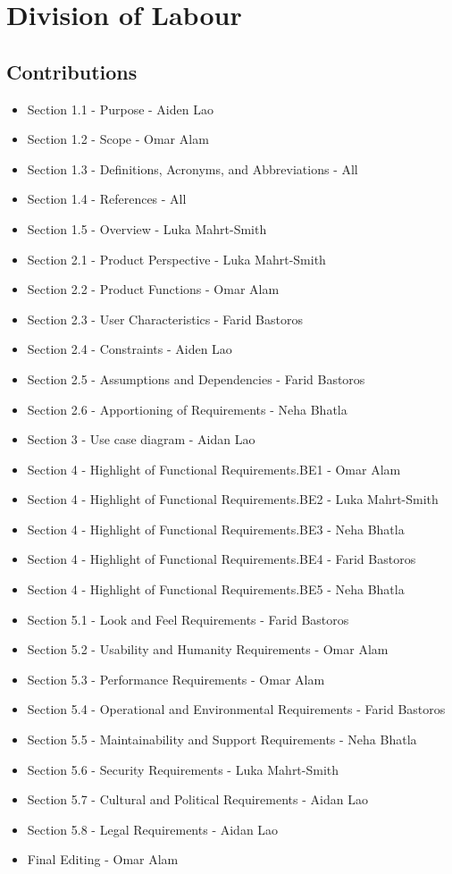 \documentclass[]{article}
\begin{document}


\appendix
\section{Division of Labour}
\label{sec:division_of_labour}

\subsection{Contributions}


\begin{itemize}
	\item Section 1.1 - Purpose - Aiden Lao
	\item Section 1.2 - Scope - Omar Alam
	\item Section 1.3 - Definitions, Acronyms, and Abbreviations - All
	\item Section 1.4 - References - All
	\item Section 1.5 - Overview - Luka Mahrt-Smith
	\item Section 2.1 - Product Perspective - Luka Mahrt-Smith
	\item Section 2.2 - Product Functions - Omar Alam
	\item Section 2.3 - User Characteristics - Farid Bastoros
	\item Section 2.4 - Constraints - Aiden Lao
	\item Section 2.5 - Assumptions and Dependencies - Farid Bastoros
	\item Section 2.6 - Apportioning of Requirements - Neha Bhatla
	\item Section 3 - Use case diagram - Aidan Lao
	\item Section 4 - Highlight of Functional Requirements.BE1 - Omar Alam
	\item Section 4 - Highlight of Functional Requirements.BE2 - Luka Mahrt-Smith
	\item Section 4 - Highlight of Functional Requirements.BE3 - Neha Bhatla
	\item Section 4 - Highlight of Functional Requirements.BE4 - Farid Bastoros
	\item Section 4 - Highlight of Functional Requirements.BE5 - Neha Bhatla
	\item Section 5.1 - Look and Feel Requirements - Farid Bastoros
	\item Section 5.2 - Usability and Humanity Requirements - Omar Alam
	\item Section 5.3 - Performance Requirements - Omar Alam
	\item Section 5.4 - Operational and Environmental Requirements - Farid Bastoros
	\item Section 5.5 - Maintainability and Support Requirements - Neha Bhatla
	\item Section 5.6 - Security Requirements - Luka Mahrt-Smith
	\item Section 5.7 - Cultural and Political Requirements - Aidan Lao
	\item Section 5.8 - Legal Requirements - Aidan Lao
	\item Final Editing - Omar Alam
\end{itemize}
\end{document}

